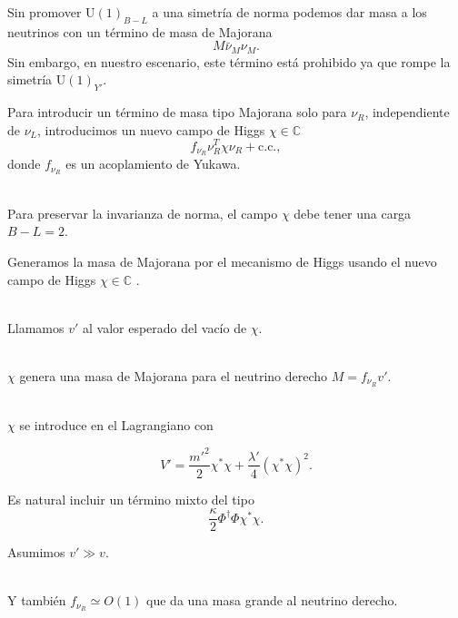 \documentclass[14pt]{beamer}
\begin{document}
\begin{frame}
Sin promover U$(1)_{B-L}$ a una simetría de norma podemos dar masa a los neutrinos con un término de masa de Majorana
$$	M\bar{\nu}_M \nu_M. $$
Sin embargo, en nuestro escenario, este término está prohibido ya que rompe la simetría U$(1)_{Y'}$.
\end{frame}


\begin{frame}
Para introducir un término de masa tipo Majorana solo para $\nu_R$, independiente de $\nu_L$, introducimos un nuevo campo de Higgs $\chi\in\mathbb{C}$
$$f_{\nu_R} \nu_R^T \chi \nu_R + \text{c.c.},$$
donde $f_{\nu_R}$ es un acoplamiento de Yukawa. \\~\

Para preservar la invarianza de norma, el campo $\chi$ debe tener una carga $B-L=2$.
\end{frame}

\begin{frame}
Generamos la masa de Majorana por el mecanismo de Higgs usando el nuevo campo de Higgs $\chi \in \mathbb{C}$ .\\~\

Llamamos $v'$ al valor esperado del vacío de $\chi$. \\~\

$\chi$ genera una masa de Majorana para el neutrino derecho $M = f_{\nu_R} v'$.  \\~\

\end{frame}

\begin{frame}

$\chi$ se introduce en el Lagrangiano con

$$V' = \frac{m'^{2}}{2}\chi^*\chi+\frac{\lambda'}{4}(\chi^*\chi)^2.$$ 

Es natural incluir un término mixto del tipo 
$$ \frac{\kappa}{2}\Phi^{\dagger}\Phi\chi^*\chi.$$

Asumimos  $v'\gg v$. \\~\

Y también $f_{\nu_R}\simeq O(1)$ que da una masa grande al neutrino derecho.
\end{frame}
\end{document}
